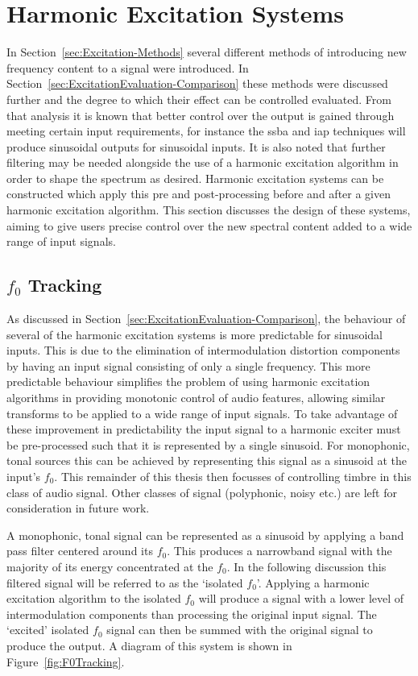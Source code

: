 \section{Harmonic Excitation Systems}
\label{sec:FeatureControl-Systems}
	In Section~\ref{sec:Excitation-Methods} several different methods of introducing new frequency content to a signal
	were introduced. In Section~\ref{sec:ExcitationEvaluation-Comparison} these methods were discussed further and the
	degree to which their effect can be controlled evaluated. From that analysis it is known that better control over
	the output is gained through meeting certain input requirements, for instance the \acrshort{ssba} and
	\acrshort{iap} techniques will produce sinusoidal outputs for sinusoidal inputs. It is also noted that further
	filtering may be needed alongside the use of a harmonic excitation algorithm in order to shape the spectrum as
	desired. Harmonic excitation systems can be constructed which apply this pre and post-processing before and after a
	given harmonic excitation algorithm. This section discusses the design of these systems, aiming to give users
	precise control over the new spectral content added to a wide range of input signals.

	\subsection{$f_{0}$ Tracking}
	\label{sec:FeatureControl-Systems-Fundamental}
		As discussed in Section~\ref{sec:ExcitationEvaluation-Comparison}, the behaviour of several of the harmonic
		excitation systems is more predictable for sinusoidal inputs. This is due to the elimination of
		intermodulation distortion components by having an input signal consisting of only a single frequency. This
		more predictable behaviour simplifies the problem of using harmonic excitation algorithms in providing
		monotonic control of audio features, allowing similar transforms to be applied to a wide range of input
		signals. To take advantage of these improvement in predictability the input signal to a harmonic exciter
		must be pre-processed such that it is represented by a single sinusoid. For monophonic, tonal sources this
		can be achieved by representing this signal as a sinusoid at the input's $f_{0}$. This remainder of this
		thesis then focusses of controlling timbre in this class of audio signal. Other classes of signal
		(polyphonic, noisy etc.) are left for consideration in future work.
		
		A monophonic, tonal signal can be represented as a sinusoid by applying a band pass filter centered around
		its $f_{0}$. This produces a narrowband signal with the majority of its energy concentrated at the $f_{0}$.
		In the following discussion this filtered signal will be referred to as the `isolated $f_{0}$'. Applying a
		harmonic excitation algorithm to the isolated $f_{0}$ will produce a signal with a lower level of
		intermodulation components than processing the original input signal. The `excited' isolated $f_{0}$ signal
		can then be summed with the original signal to produce the output. A diagram of this system is shown in
		Figure~\ref{fig:F0Tracking}.

